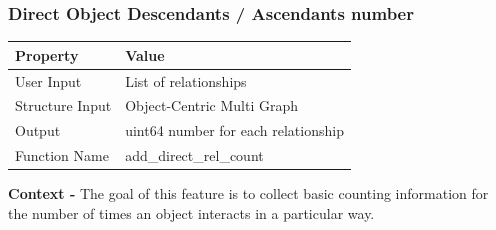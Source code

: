 \documentclass{article}
\begin{document}
\subsubsection{Direct Object Descendants / Ascendants number}
\begin{center}
	\begin{tabular}{| p{3cm} p{7cm} |}
		\hline
		\textbf{Property} & \textbf{Value}\\
		\hline
		User Input & List of relationships\\
		Structure Input & Object-Centric Multi Graph\\
		Output & uint64 number for each relationship\\
		Function Name & add\_direct\_rel\_count\\
		\hline
	\end{tabular}
\end{center}

\textbf{Context -} The goal of this feature is to collect basic counting information for the number of times an object interacts in a particular way.
\\
\end{document}

